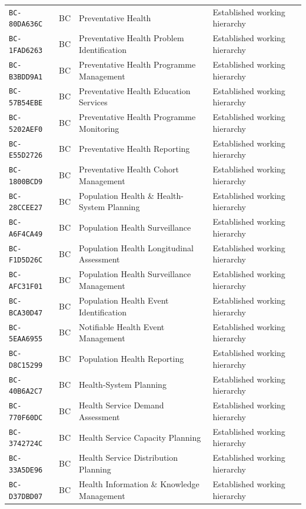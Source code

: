 \documentclass[11pt,a4paper,openany]{book}
\begin{document}
\begin{longtable}{@{}p{.19\linewidth}p{.12\linewidth}p{.39\linewidth}p{.24\linewidth}@{}}
\texttt{BC-80DA636C} & BC & Preventative Health & Established working hierarchy \\
\texttt{BC-1FAD6263} & BC & Preventative Health Problem Identification & Established working hierarchy \\
\texttt{BC-B3BDD9A1} & BC & Preventative Health Programme Management & Established working hierarchy \\
\texttt{BC-57B54EBE} & BC & Preventative Health Education Services & Established working hierarchy \\
\texttt{BC-5202AEF0} & BC & Preventative Health Programme Monitoring & Established working hierarchy \\
\texttt{BC-E55D2726} & BC & Preventative Health Reporting & Established working hierarchy \\
\texttt{BC-1800BCD9} & BC & Preventative Health Cohort Management & Established working hierarchy \\
\texttt{BC-28CCEE27} & BC & Population Health \& Health-System Planning & Established working hierarchy \\
\texttt{BC-A6F4CA49} & BC & Population Health Surveillance & Established working hierarchy \\
\texttt{BC-F1D5D26C} & BC & Population Health Longitudinal Assessment & Established working hierarchy \\
\texttt{BC-AFC31F01} & BC & Population Health Surveillance Management & Established working hierarchy \\
\texttt{BC-BCA30D47} & BC & Population Health Event Identification & Established working hierarchy \\
\texttt{BC-5EAA6955} & BC & Notifiable Health Event Management & Established working hierarchy \\
\texttt{BC-D8C15299} & BC & Population Health Reporting & Established working hierarchy \\
\texttt{BC-40B6A2C7} & BC & Health-System Planning & Established working hierarchy \\
\texttt{BC-770F60DC} & BC & Health Service Demand Assessment & Established working hierarchy \\
\texttt{BC-3742724C} & BC & Health Service Capacity Planning & Established working hierarchy \\
\texttt{BC-33A5DE96} & BC & Health Service Distribution Planning & Established working hierarchy \\
\texttt{BC-D37DBD07} & BC & Health Information \& Knowledge Management & Established working hierarchy \\

\end{longtable}
\end{document}
